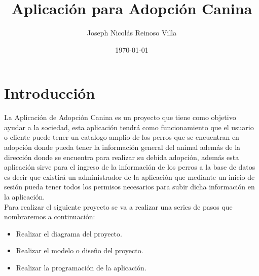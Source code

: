 \documentclass[12pt]{article}
\title{Aplicación para Adopción Canina}
\author{Joseph Nicolás Reinoso Villa}
\date{\today}
\begin{document}
 

\maketitle 
\tableofcontents{}
\newpage
\section{Introducción}
La Aplicación de Adopción Canina es un proyecto que tiene como objetivo ayudar a la sociedad, esta aplicación tendrá como funcionamiento que el usuario o cliente puede tener un catalogo amplio de los perros que se encuentran en adopción donde pueda tener la información general del animal además de la dirección donde se encuentra para realizar su debida adopción, además esta aplicación sirve para el ingreso de la información de los perros a la base de datos es decir que existirá un administrador de la aplicación que mediante un inicio de sesión pueda tener todos los permisos necesarios para subir dicha información en la aplicación.
\\
Para realizar el siguiente proyecto se va a realizar una series de pasos que nombraremos a continuación:
\begin{itemize}
\item Realizar el diagrama del proyecto.
\item Realizar el modelo o diseño del proyecto.
\item Realizar la programación de la aplicación.
\end{itemize}
\end{document}
